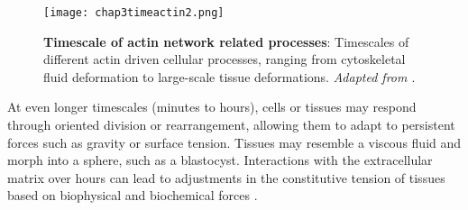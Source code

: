 \begin{figure}[h!]
	\centering
	\texttt{[image: chap3timeactin2.png]}
	\caption{\label{fig_3_5} 
		\textbf{Timescale of actin network related processes}: Timescales of different actin driven cellular processes, ranging from cytoskeletal fluid deformation to large-scale tissue deformations. \textit{Adapted from \cite{kelkar2020}}.}
\end{figure}

At even longer timescales (minutes to hours), cells or tissues may respond through oriented division or rearrangement, allowing them to adapt to persistent forces such as gravity or surface tension. Tissues may resemble a viscous fluid and morph into a sphere, such as a blastocyst. Interactions with the extracellular matrix over hours can lead to adjustments in the constitutive tension of tissues based on biophysical and biochemical forces \cite{porazinski2015}.


